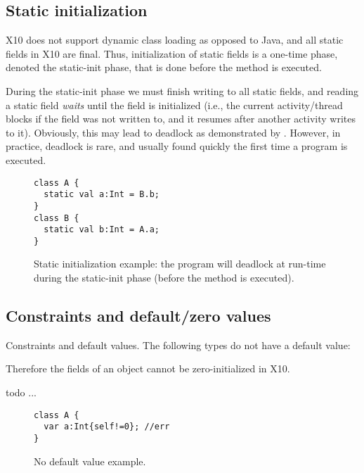 \subsection{Static initialization}
X10 does not support dynamic class loading as opposed to Java,
    and all static fields in X10 are final.
Thus, initialization of static fields is a one-time phase, denoted the static-init phase,
    that is done before the  method is executed.

During the static-init phase we must finish writing to all static fields,
    and reading a static field \emph{waits} until the field is initialized
    (i.e., the current activity/thread blocks if the field was not written to,
    and it resumes after another activity writes to it).
Obviously, this may lead to deadlock as demonstrated by .
However, in practice, deadlock is rare,
    and usually found quickly the first time a program is executed.

\begin{figure}
\begin{lstlisting}
class A {
  static val a:Int = B.b;
}
class B {
  static val b:Int = A.a;
}
\end{lstlisting}
\caption{Static initialization example:
    the program will deadlock at run-time
    during the static-init phase (before the  method is executed).
    }
\label{Figure:Static-init}
\end{figure}


\subsection{Constraints and default/zero values}
Constraints and default values.
The following types do not have a default value:

Therefore the fields of an object cannot be zero-initialized in X10.

 todo ...

\begin{figure}
\begin{lstlisting}
class A {
  var a:Int{self!=0}; //err
}
\end{lstlisting}
\caption{No default value example.
    }
\label{Figure:Constraints}
\end{figure}


